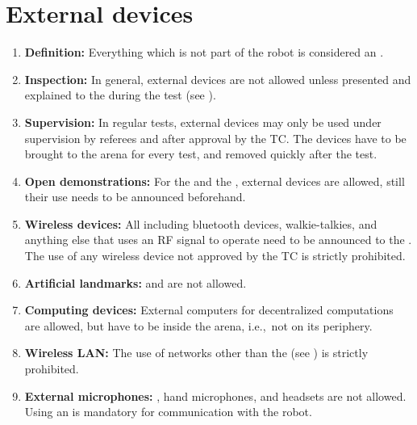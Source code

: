 \section{External devices}\label{rule:roobt_external_devices}
\begin{enumerate}
	\item \textbf{Definition:} Everything which is not part of the robot is considered an . 
	\item \textbf{Inspection:} In general, external devices are not allowed unless presented and explained to the  during the  test (see ).
	\item \textbf{Supervision:} In regular tests, external devices may only be used under supervision by referees and after approval by the TC. The devices have to be brought to the arena for every test, and removed quickly after the test.
	\item \textbf{Open demonstrations:} For the  and the , external devices are allowed, still their use needs to be announced beforehand.
	\item \textbf{Wireless devices:} All  including bluetooth devices, walkie-talkies, and anything else that uses an RF signal to operate need to be announced to the . The use of any wireless device not approved by the TC is strictly prohibited.  
	\item \textbf{Artificial landmarks:}  and  are not allowed.
	\item \textbf{Computing devices:} External computers for decentralized computations are allowed, but have to be inside the arena, i.e.,~not on its periphery.
	\item \textbf{Wireless LAN:} The use of networks other than the  (see ) is strictly prohibited.
	\item \textbf{External microphones: }, hand microphones, and headsets are not allowed. Using an  is mandatory for communication with the robot.
\end{enumerate}


